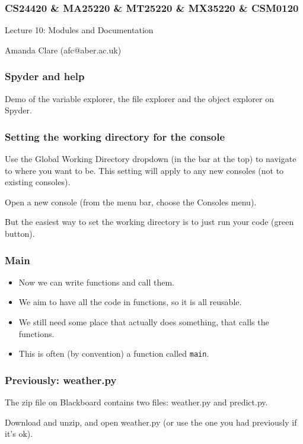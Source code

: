 \documentclass{beamer}
\begin{document}


\begin{frame}
\frametitle{CS24420 \& MA25220 \& MT25220 \& MX35220 \& CSM0120}

\begin{center}
\begin{huge}
Lecture 10: Modules and Documentation
\end{huge}
\bigskip

Amanda Clare (afc@aber.ac.uk)

\end{center}
\end{frame}

\begin{frame} 
\frametitle{Spyder and help}
Demo of the variable explorer, the file explorer and the object explorer on Spyder.
\end{frame}

\begin{frame} 
\frametitle{Setting the working directory for the console}
Use the Global Working Directory dropdown (in the bar at the top) to
navigate to where you want to be. This setting will apply to any new
consoles (not to existing consoles).

Open a new console (from the menu bar, choose the Consoles menu).

\bigskip

But the easiest way to set the working directory is to just run your code (green button). 
\end{frame}

\begin{frame} 
\frametitle{Main}
\begin{itemize}
\item Now we can write functions and call them.
\item We aim to have all the code in functions, so it is all
reusable.
\item We still need some place that actually does
something, that calls the functions.
\item This is often (by convention) a function called \texttt{main}.
\end{itemize}
\end{frame}

\begin{frame}[fragile]
\frametitle{Previously: weather.py}
The zip file on Blackboard contains two files: weather.py and
predict.py. 

Download and unzip, and open weather.py (or use the one
you had previously if it's ok).
\end{frame}
\end{document}
